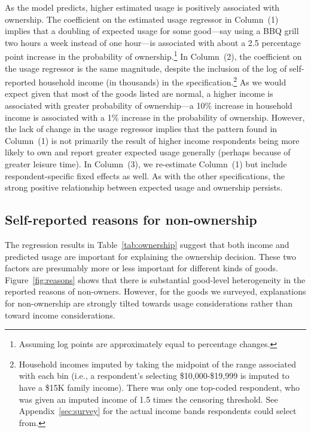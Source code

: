 \documentclass[11pt]{article}
\begin{document}


As the model predicts, higher estimated usage is positively associated with ownership.
The coefficient on the estimated usage regressor in Column~(1) implies that a doubling of expected usage for some good---say using a BBQ grill two hours a week instead of one hour---is associated with about a 2.5 percentage point increase in the probability of ownership.\footnote{Assuming log points are approximately equal to percentage changes.} 
In Column~(2), the coefficient on the usage regressor is the same magnitude, despite the inclusion of the log of self-reported household income (in thousands) in the specification.\footnote{
  Household incomes imputed by taking the midpoint of the range associated with each bin (i.e., a respondent's selecting \$10,000-\$19,999 is imputed to have a \$15K family income).
  There was only one top-coded respondent, who was given an imputed income of 1.5 times the censoring threshold.
  See Appendix~\ref{sec:survey} for the actual income bands respondents could select from.
  }
As we would expect given that most of the goods listed are normal, a higher income is associated with greater probability of ownership---a 10\% increase in household income is associated with a 1\% increase in the probability of ownership.  
However, the lack of change in the usage regressor implies that the pattern found in Column~(1) is not primarily the result of higher income respondents being more likely to own and report greater expected usage generally (perhaps because of greater leisure time). 
In Column~(3), we re-estimate Column~(1) but include respondent-specific fixed effects as well.
As with the other specifications, the strong positive relationship between expected usage and ownership persists. 

\subsection{Self-reported reasons for non-ownership}

The regression results in Table~\ref{tab:ownership} suggest that both income and predicted usage are important for explaining the ownership decision. 
These two factors are presumably more or less important for different kinds of goods.
Figure~\ref{fig:reasons} shows that there is substantial good-level heterogeneity in the reported reasons of non-owners.
However, for the goods we surveyed, explanations for non-ownership are strongly tilted towards usage considerations rather than toward income considerations.
\end{document}
